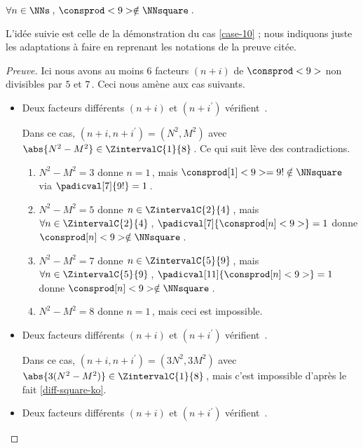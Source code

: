 \begin{fact} \label{case-9}
	 $\forall n \in \NNs$\,, $\consprod<9> \notin \NNsquare$\,.
\end{fact}




L'idée suivie est celle de la démonstration du cas \ref{case-10} ; nous indiquons juste les adaptations à faire en reprenant les notations de la preuve citée.


\begin{proof}[Preuve]%
    Ici nous avons au moins $6$ facteurs $(n + i)$ de $\consprod<9>$ non divisibles par $5$ et $7$\,. Ceci nous amène aux cas suivants.
    \begin{itemize}
    	\medskip
		\item Deux facteurs différents $(n+i)$ et $(n+i^\prime)$ vérifient \,.
		
		\smallskip
		\noindent
		Dans ce cas, $(n+i, n+i^\prime) = (N^2, M^2)$ avec $\abs{N^2 - M^2} \in \ZintervalC{1}{8}$\,. Ce qui suit lève des contradictions.
		\begin{enumerate}
			\item $N^2 - M^2 = 3$ donne $n = 1$\,, mais $\consprod[1]<9> = 9 ! \notin \NNsquare$ via $\padicval[7]{9!} = 1$\,.


			\item $N^2 - M^2 = 5$ donne $n \in \ZintervalC{2}{4}$\,, mais $\forall n \in \ZintervalC{2}{4}$\,, $\padicval[7]{\consprod[n]<9>} = 1$ donne $\consprod[n]<9> \notin \NNsquare$\,.
			

			\item $N^2 - M^2 = 7$ donne $n \in \ZintervalC{5}{9}$\,, mais $\forall n \in \ZintervalC{5}{9}$\,, $\padicval[11]{\consprod[n]<9>} = 1$ donne $\consprod[n]<9> \notin \NNsquare$\,.


			\item $N^2 - M^2 = 8$ donne $n = 1$\,, mais ceci est impossible.
		\end{enumerate}


    	\medskip
		\item Deux facteurs différents $(n+i)$ et $(n+i^\prime)$ vérifient \,.
		
		\smallskip
		\noindent
		Dans ce cas, $(n+i, n+i^\prime) = (3 N^2, 3 M^2)$ avec $\abs{3(N^2 - M^2)} \in \ZintervalC{1}{8}$\,, mais c'est impossible d'après le fait \ref{diff-square-ko}.

    	\medskip
		\item Deux facteurs différents $(n+i)$ et $(n+i^\prime)$ vérifient \,.
		

\end{itemize}
\end{proof}
